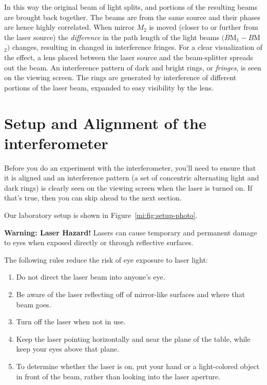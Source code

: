 In this way the original beam of light splits, and portions of the resulting beams are brought back together. The
beams are from the same source and their phases are hence highly correlated. When mirror $M_2$ is moved (closer to or
further from the laser source) the \textit{difference} in the path length of the light beams $(B$M$_1 - B$M$_2)$ changes, resulting in
changed in interference fringes. For a clear visualization of the effect, a lens placed between the laser source and the
beam-splitter spreads out the beam. An interference pattern of dark and bright rings, or \textit{fringes}, is seen on the
viewing screen. The rings are generated by interference of different portions of the laser beam, expanded to easy
visibility by the lens.

\section{Setup and Alignment of the interferometer}

Before you do an experiment with the interferometer, you'll need to ensure that it is aligned and an interference pattern (a set of concentric alternating light and dark rings) is clearly seen on the viewing screen when the laser is turned on. If that's true, then you can skip ahead to the next section.

Our laboratory setup is shown in Figure~\ref{mi:fig:setup-photo}.

\begin{framed}
	\textbf{Warning: Laser Hazard!} Lasers can cause temporary and permanent damage to eyes when exposed directly or through reflective surfaces.
	
	The following rules reduce the risk of eye exposure to laser light:
	\begin{enumerate}
		\item Do not direct the laser beam into anyone's eye.
		\item Be aware of the laser reflecting off of mirror-like surfaces and where that beam goes.
		\item Turn off the laser when not in use.
		\item Keep the laser pointing horizontally and near the plane of the table, while keep your eyes above that plane.
		\item To determine whether the laser is on, put your hand or a light-colored object in front of the beam, rather than looking into the laser aperture.
	\end{enumerate}
\end{framed}

